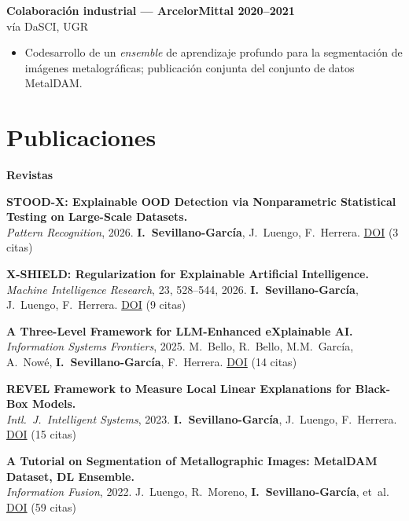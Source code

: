 \documentclass[10pt,a4paper]{article}
\newcommand{\blueitem}[1]{\textcolor{subtitleblue}{\textbf{#1}}}
\newcommand{\sub}[1]{\textcolor{subtle}{\footnotesize #1}}
\begin{document}
\blueitem{Colaboración industrial --- ArcelorMittal \hfill 2020--2021} \\
\sub{vía DaSCI, UGR}
\begin{itemize}
    \item Codesarrollo de un \textit{ensemble} de aprendizaje profundo para la segmentación de imágenes metalográficas; publicación conjunta del conjunto de datos MetalDAM.
\end{itemize}

\section*{Publicaciones}

\small

\blueitem{Revistas}

\textbf{STOOD-X: Explainable OOD Detection via Nonparametric Statistical Testing on Large-Scale Datasets.} \\
\sub{\textit{Pattern Recognition}, 2026. \textbf{I.~Sevillano-García}, J.~Luengo, F.~Herrera. \href{https://doi.org/10.1016/j.patcog.2026.113254}{DOI} \quad (3 citas)}

\textbf{X-SHIELD: Regularization for Explainable Artificial Intelligence.} \\
\sub{\textit{Machine Intelligence Research}, 23, 528--544, 2026. \textbf{I.~Sevillano-García}, J.~Luengo, F.~Herrera. \href{https://doi.org/10.1007/s11633-025-1576-y}{DOI} \quad (9 citas)}

\textbf{A Three-Level Framework for LLM-Enhanced eXplainable AI.} \\
\sub{\textit{Information Systems Frontiers}, 2025. M.~Bello, R.~Bello, M.M.~García, A.~Nowé, \textbf{I.~Sevillano-García}, F.~Herrera. \href{https://doi.org/10.1007/s10796-025-10668-1}{DOI} \quad (14 citas)}

\textbf{REVEL Framework to Measure Local Linear Explanations for Black-Box Models.} \\
\sub{\textit{Intl.~J.~Intelligent Systems}, 2023. \textbf{I.~Sevillano-García}, J.~Luengo, F.~Herrera. \href{https://doi.org/10.1155/2023/8068569}{DOI} \quad (15 citas)}

\textbf{A Tutorial on Segmentation of Metallographic Images: MetalDAM Dataset, DL Ensemble.} \\
\sub{\textit{Information Fusion}, 2022. J.~Luengo, R.~Moreno, \textbf{I.~Sevillano-García}, et~al. \href{https://doi.org/10.1016/j.inffus.2021.09.018}{DOI} \quad (59 citas)}
\end{document}
